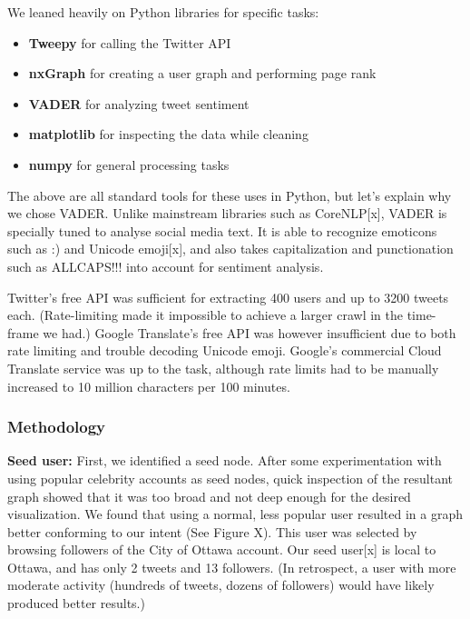\documentclass[12pt]{article}
\begin{document}
We leaned heavily on Python libraries for specific tasks:
\begin{itemize}
    \item \textbf{Tweepy} for calling the Twitter API
    \item \textbf{nxGraph} for creating a user graph and performing page rank
    \item \textbf{VADER} for analyzing tweet sentiment
    \item \textbf{matplotlib} for inspecting the data while cleaning
    \item \textbf{numpy} for general processing tasks
\end{itemize}

The above are all standard tools for these uses in Python, but let's explain why we chose VADER. Unlike mainstream libraries such as CoreNLP[x], VADER is specially tuned to analyse social media text. It is able to recognize emoticons such as :) and Unicode emoji[x], and also takes capitalization and punctionation such as ALLCAPS!!! into account for sentiment analysis.\newline

Twitter's free API was sufficient for extracting 400 users and up to 3200 tweets each. (Rate-limiting made it impossible to achieve a larger crawl in the time-frame we had.) Google Translate's free API was however insufficient due to both rate limiting and trouble decoding Unicode emoji. Google's commercial Cloud Translate service was up to the task, although rate limits had to be manually increased to 10 million characters per 100 minutes.\newline

\subsubsection{Methodology}

\textbf{Seed user:} First, we identified a seed node. After some experimentation with using popular celebrity accounts as seed nodes, quick inspection of the resultant graph showed that it was too broad and not deep enough for the desired visualization. We found that using a normal, less popular user resulted in a graph better conforming to our intent (See Figure X). This user was selected by browsing followers of the City of Ottawa account. Our seed user[x] is local to Ottawa, and has only 2 tweets and 13 followers. (In retrospect, a user with more moderate activity (hundreds of tweets, dozens of followers) would have likely produced better results.)\newline
\end{document}
